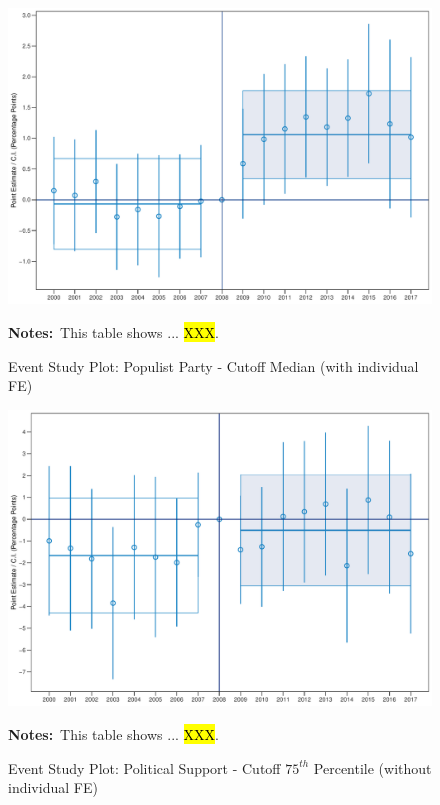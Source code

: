 \documentclass[11pt]{article}
\begin{document}
\begin{figure}[htbp!]
    \centering
    \caption{Event Study Plot: Populist Party - Cutoff Median (with individual FE)}\label{fig:dynamic_did_cbk_past_mean_pp_p50_ife}
    \includegraphics[width=1\linewidth]{events/dynamic_did_cbk_past_mean_pp_p50_ife}
    \begin{tablenotes}
        \footnotesize
        \item \textbf{Notes:}~This table shows ... \hl{XXX}.
    \end{tablenotes} 
\end{figure}

\begin{figure}[htbp!]
    \centering
    \caption{Event Study Plot: Political Support - Cutoff $75^{th}$ Percentile (without individual FE)}\label{fig:dynamic_did_cbk_past_mean_ps_p75_noife}
    \includegraphics[width=1\linewidth]{events/dynamic_did_cbk_past_mean_ps_p75_noife}
    \begin{tablenotes}
        \footnotesize
        \item \textbf{Notes:}~This table shows ... \hl{XXX}.
    \end{tablenotes} 
\end{figure}
\end{document}
